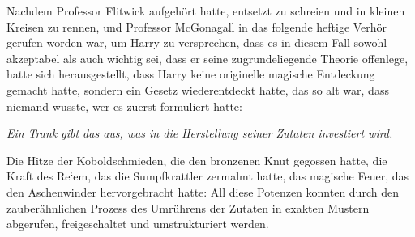Nachdem Professor Flitwick aufgehört hatte, entsetzt zu schreien und in kleinen Kreisen zu rennen, und Professor McGonagall in das folgende heftige Verhör gerufen worden war, um Harry zu versprechen, dass es in diesem Fall sowohl akzeptabel als auch wichtig sei, dass er seine zugrundeliegende Theorie offenlege, hatte sich herausgestellt, dass Harry keine originelle magische Entdeckung gemacht hatte, sondern ein Gesetz wiederentdeckt hatte, das so alt war, dass niemand wusste, wer es zuerst formuliert hatte:

\emph{Ein Trank gibt das aus, was in die Herstellung seiner Zutaten investiert wird.}

Die Hitze der Koboldschmieden, die den bronzenen Knut gegossen hatte, die Kraft des Re‘em, das die Sumpfkrattler zermalmt hatte, das magische Feuer, das den Aschenwinder hervorgebracht hatte: All diese Potenzen konnten durch den zauberähnlichen Prozess des Umrührens der Zutaten in exakten Mustern abgerufen, freigeschaltet und umstrukturiert werden.

